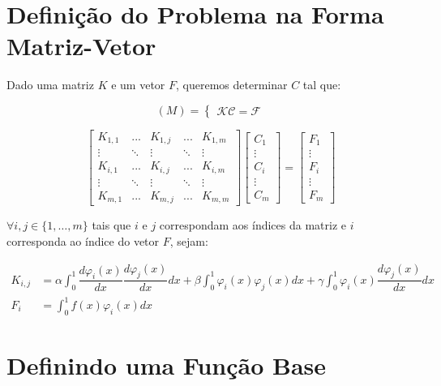 \section{Definição do Problema na Forma Matriz-Vetor}

  Dado uma matriz $K$ e um vetor $F$, queremos determinar $C$ tal que:

  \[(M) = \begin{cases} \mathcal{K}\mathcal{C} = \mathcal{F} \end{cases}\]

  \[
  \begin{bmatrix}
    K_{1,1} & ... & K_{1,j} & ... & K_{1,m} \\
    \vdots & \ddots & \vdots & \ddots & \vdots \\
    K_{i,1} & ... & K_{i,j} & ... & K_{i,m} \\
    \vdots & \ddots & \vdots & \ddots & \vdots \\
    K_{m,1} & ... & K_{m,j} & ... & K_{m,m}
  \end{bmatrix}
  \begin{bmatrix}
    C_1 \\ \vdots \\ C_i \\ \vdots \\ C_m
  \end{bmatrix}
  =
  \begin{bmatrix}
  F_1 \\ \vdots \\ F_i \\ \vdots \\ F_m
  \end{bmatrix}
  \]

  $\forall i, j \in \{1,\dots,m\}$ tais que $i$ e $j$ correspondam aos índices da matriz e $i$ corresponda ao índice do vetor $F$, sejam:

  \begin{align*}
  K_{i,j} &= \alpha \int_{0}^{1} \dfrac{d\varphi_i(x)}{dx} \dfrac{d\varphi_j(x)}{dx}dx + \beta \int_{0}^{1} \varphi_i(x) \varphi_j(x)dx + \gamma \int_{0}^{1} \varphi_i(x) \dfrac{d\varphi_j(x)}{dx}dx \\
  F_i &= \int_{0}^{1} f(x) \varphi_i(x) dx
  \end{align*}

\section{Definindo uma Função Base}

